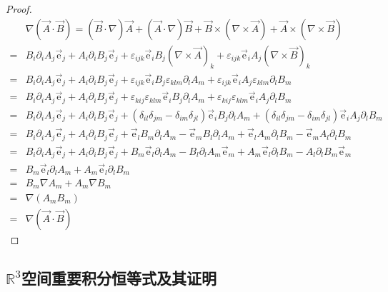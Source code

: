 \begin{proof}
\begin{equation}
\begin{split}
&\nabla\left(\vec{A}\cdot\vec{B}\right)=\left(\vec{B}\cdot \nabla\right)\vec{A}+\left(\vec{A}\cdot\nabla\right)\vec{B}+\vec{B}\times\left(\nabla\times\vec{A}\right)+\vec{A}\times\left(\nabla\times\vec{B}\right) \\
=&B_i\partial_i A_j \vec{\mathrm{e}}_j + A_i\partial_i B_j\vec{\mathrm{e}}_j + \varepsilon_{ijk}\vec{\mathrm{e}}_iB_j\left(\nabla\times\vec{A}\right)_k + \varepsilon_{ijk} \vec{\mathrm{e}}_i A_j\left(\nabla\times\vec{B}\right)_k \\
=&B_i\partial_i A_j \vec{\mathrm{e}}_j + A_i\partial_i B_j\vec{\mathrm{e}}_j + \varepsilon_{ijk}\vec{\mathrm{e}}_iB_j\varepsilon_{klm}\partial_l A_m + \varepsilon_{ijk} \vec{\mathrm{e}}_i A_j\varepsilon_{klm}\partial_l B_m \\
=&B_i\partial_i A_j \vec{\mathrm{e}}_j + A_i\partial_i B_j\vec{\mathrm{e}}_j + \varepsilon_{kij}\varepsilon_{klm}\vec{\mathrm{e}}_iB_j\partial_l A_m + \varepsilon_{kij}\varepsilon_{klm} \vec{\mathrm{e}}_i A_j\partial_l B_m \\
=&B_i\partial_i A_j \vec{\mathrm{e}}_j + A_i\partial_i B_j\vec{\mathrm{e}}_j + (\delta_{il}\delta_{jm}-\delta_{im}\delta_{jl})\vec{\mathrm{e}}_iB_j\partial_l A_m + (\delta_{il}\delta_{jm}-\delta_{im}\delta_{jl}) \vec{\mathrm{e}}_i A_j\partial_l B_m \\
=&B_i\partial_i A_j \vec{\mathrm{e}}_j + A_i\partial_i B_j\vec{\mathrm{e}}_j + \vec{\mathrm{e}}_l B_m\partial_l A_m -\vec{\mathrm{e}}_m B_l\partial_l A_m + \vec{\mathrm{e}}_l A_m\partial_l B_m - \vec{\mathrm{e}}_m A_l\partial_l B_m \\
=&B_i\partial_i A_j \vec{\mathrm{e}}_j + A_i\partial_i B_j\vec{\mathrm{e}}_j +  B_m\vec{\mathrm{e}}_l\partial_l A_m -B_l\partial_l A_m \vec{\mathrm{e}}_m + A_m\vec{\mathrm{e}}_l \partial_l B_m -  A_l\partial_l B_m \vec{\mathrm{e}}_m \\
=&B_m\vec{\mathrm{e}}_l\partial_l A_m + A_m\vec{\mathrm{e}}_l \partial_l B_m \\
=&B_m\nabla A_m + A_m \nabla B_m \\
=&\nabla(A_m B_m) \\
=&\nabla\left(\vec{A}\cdot\vec{B}\right)
\end{split}
\end{equation}
\end{proof}

\subsection{\texorpdfstring{$\mathbb{R}^3 $空间重要积分恒等式及其证明}{R3空间重要积分恒等式及其证明}}

